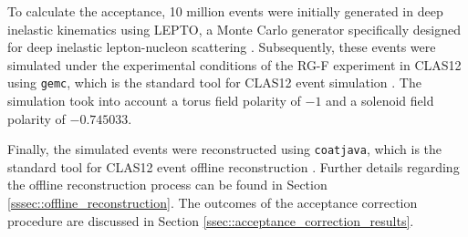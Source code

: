     To calculate the acceptance, 10 million events were initially generated in deep inelastic kinematics using LEPTO, a Monte Carlo generator specifically designed for deep inelastic lepton-nucleon scattering \cite{ingelman1997}.
    Subsequently, these events were simulated under the experimental conditions of the RG-F experiment in CLAS12 using \texttt{gemc}, which is the standard tool for CLAS12 event simulation \cite{ungaro2020gemc}.
    The simulation took into account a torus field polarity of $-1$ and a solenoid field polarity of $-0.745033$.

    Finally, the simulated events were reconstructed using \texttt{coatjava}, which is the standard tool for CLAS12 event offline reconstruction \cite{ziegler2020}.
    Further details regarding the offline reconstruction process can be found in Section \ref{sssec::offline_reconstruction}.
    The outcomes of the acceptance correction procedure are discussed in Section \ref{ssec::acceptance_correction_results}.
